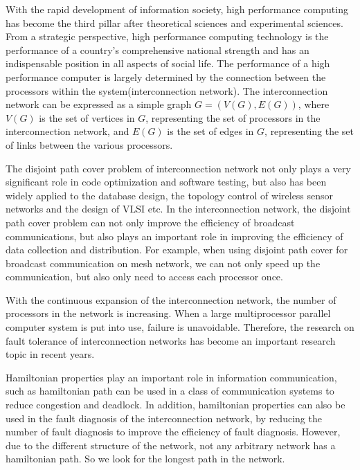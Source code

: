 \begin{englishabstract}

With the rapid development of information society, high performance computing has become the third pillar after theoretical sciences and experimental sciences.
From a strategic perspective, high performance computing technology is the performance of a country's comprehensive national strength
and has an indispensable position in all aspects of social life.
The performance of a high performance computer is largely determined by the connection between the processors within the system(interconnection network).
The interconnection network can be expressed as a simple graph $G=(V(G),E(G))$, where $V(G)$ is the set of vertices in $G$, representing the set of processors in the interconnection network, and $E(G)$ is the set of edges in $G$, representing the set of links between the various processors.

The disjoint path cover problem of interconnection network not only plays a very significant role in code optimization and software testing,
but also has been widely applied to the database design, the topology control of wireless sensor networks and the design of VLSI etc.
In the interconnection network, the disjoint path cover problem can not only improve the efficiency of broadcast communications,
but also plays an important role in improving the efficiency of data collection and distribution.
For example, when using disjoint path cover for broadcast communication on mesh network, we can not only speed up the communication, but also only need to access each processor once.

With the continuous expansion of the interconnection network, the number of processors in the network is increasing.
When a large multiprocessor parallel computer system is put into use, failure is unavoidable.
Therefore, the research on fault tolerance of interconnection networks has become an important research topic in recent years.

Hamiltonian properties play an important role in information communication, such as hamiltonian path can be used in a class of communication systems to reduce congestion and deadlock.
In addition, hamiltonian properties can also be used in the fault diagnosis of the interconnection network,
by reducing the number of fault diagnosis to improve the efficiency of fault diagnosis.
However, due to the different structure of the network, not any arbitrary network has a hamiltonian path.
So we look for the longest path in the network.



\end{englishabstract}
